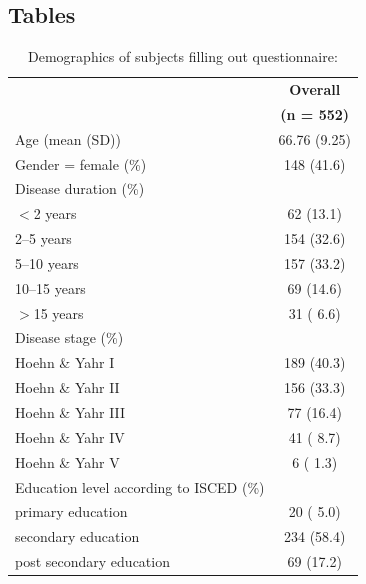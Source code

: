 \documentclass{bmcart}
\begin{document}
\begin{backmatter}
\section*{Tables}
\begin{table}[!ht]
\caption{Demographics of subjects filling out questionnaire:}
\label{tab1:demographics}
\begin{tabular}{p{5cm} c}
\toprule
&\textbf{Overall}\\ %
& \textbf{(n = 552)}\\ 
\midrule
Age (mean (SD)) & 66.76 (9.25) \\ \hline
Gender = female (\%) &  148 (41.6)  \\ \hline
Disease duration (\%) & \\ \hline
\hspace{3mm} $<$2 years & 62 (13.1) \\ \hline
\hspace{3mm} 2--5 years & 154 (32.6) \\ \hline
\hspace{3mm} 5--10 years & 157 (33.2) \\ \hline
\hspace{3mm} 10--15 years & 69 (14.6) \\ \hline
\hspace{3mm} $>$15 years& 31 ( 6.6) \\ \hline
Disease stage (\%)& \\ \hline
\hspace{3mm} Hoehn \& Yahr I &  189 (40.3) \\ \hline
\hspace{3mm} Hoehn \& Yahr II & 156 (33.3)  \\ \hline
\hspace{3mm} Hoehn \& Yahr III  &   77 (16.4) \\ \hline
\hspace{3mm} Hoehn \& Yahr IV  & 41 ( 8.7) \\ \hline
\hspace{3mm} Hoehn \& Yahr V  &     6 ( 1.3) \\ \hline
Education level according \newline to ISCED (\%) & \\ \hline
\hspace{3mm} primary education  & 20 ( 5.0) \\ \hline
\hspace{3mm} secondary education  & 234 (58.4)\\ \hline
\hspace{3mm} post secondary education  &   69 (17.2) \\ \hline

\end{tabular}
\end{table}
\end{backmatter}
\end{document}
